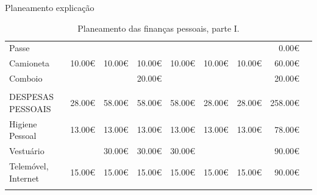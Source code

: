 \documentclass[11pt]{beamer}
\begin{document}
\begin{frame}[ allowframebreaks ]{Planeamento explicação}
\begin{table}[!htp]
\begin{tabular}{lrrrrrrrr}
				Passe & & & & & & &\cellcolor[HTML]{4285f4}0.00€ \\
				Camioneta &10.00€ &10.00€ &10.00€ &10.00€ &10.00€ &10.00€ &\cellcolor[HTML]{4285f4}60.00€ \\
				Comboio & & &20.00€ & & & &\cellcolor[HTML]{4285f4}20.00€ \\
				& & & & & & & \\
				\cellcolor[HTML]{4285f4}DESPESAS PESSOAIS &\cellcolor[HTML]{4285f4}28.00€ &\cellcolor[HTML]{4285f4}58.00€ &\cellcolor[HTML]{4285f4}58.00€ &\cellcolor[HTML]{4285f4}58.00€ &\cellcolor[HTML]{4285f4}28.00€ &\cellcolor[HTML]{4285f4}28.00€ &\cellcolor[HTML]{4285f4}258.00€ \\
				Higiene Pessoal &13.00€ &13.00€ &13.00€ &13.00€ &13.00€ &13.00€ &\cellcolor[HTML]{4285f4}78.00€ \\
				Vestuário & &30.00€ &30.00€ &30.00€ & & &\cellcolor[HTML]{4285f4}90.00€ \\
				Telemóvel, Internet &15.00€ &15.00€ &15.00€ &15.00€ &15.00€ &15.00€ &\cellcolor[HTML]{4285f4}90.00€ \\
				& & & & & & & \\
				\bottomrule
			\end{tabular}
			\caption{Planeamento das finanças pessoais, parte I.}\label{tab:planeamento1 }
		\end{table}



\end{frame}
\end{document}
